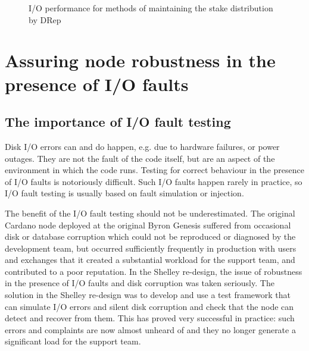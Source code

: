 \documentclass[11pt,a4paper]{article}
\begin{document}
\begin{figure}
\centering
{}
\caption{I/O performance for methods of maintaining the stake distribution by DRep}
\label{fig:io-perf-stake-distr}
\end{figure}

\section{Assuring node robustness in the presence of I/O faults}
\label{sec:assurance}

\subsection{The importance of I/O fault testing}

Disk I/O errors can and do happen, e.g. due to hardware failures, or power
outages. They are not the fault of the code itself, but are an aspect of the
environment in which the code runs. Testing for correct behaviour in the
presence of I/O faults is notoriously difficult. Such I/O faults happen rarely
in practice, so I/O fault testing is usually based on fault simulation or
injection.

The benefit of the I/O fault testing should not be underestimated. The original
Cardano node deployed at the original Byron Genesis suffered from occasional
disk or database corruption which could not be reproduced or diagnosed by the
development team, but occurred sufficiently frequently in production with users
and exchanges that it created a substantial workload for the support team, and
contributed to a poor reputation. In the Shelley re-design, the issue of
robustness in the presence of I/O faults and disk corruption was taken
seriously. The solution in the Shelley re-design was to develop and use a test
framework that can simulate I/O errors and silent disk corruption and check
that the node can detect and recover from them. This has proved very successful
in practice: such errors and complaints are now almost unheard of and they no
longer generate a significant load for the support team.
\end{document}
